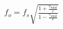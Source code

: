 \documentclass[preview]{standalone}
\begin{document}
\begin{align*}
f_{o}=f_{s}\sqrt{\frac{1+\frac{v_{\text{wind}}}{c}}{1-\frac{v_{\text{wind}}}{c}}}
\end{align*}
\end{document}
